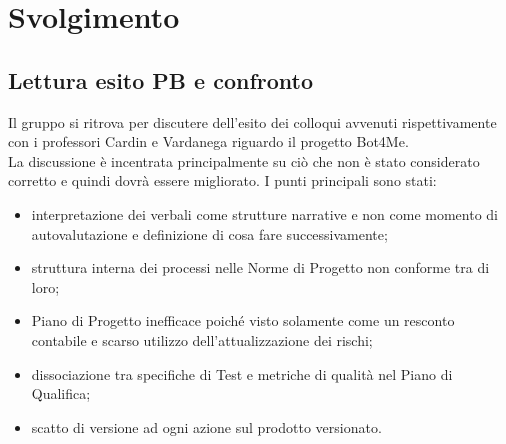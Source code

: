 \section{Svolgimento}

\subsection{Lettura esito PB e confronto }
Il gruppo si ritrova per discutere dell'esito dei colloqui avvenuti rispettivamente con i professori Cardin e Vardanega riguardo il progetto Bot4Me. \\
La discussione è incentrata principalmente su ciò che non è stato considerato corretto e quindi dovrà essere migliorato. I punti principali sono stati: 
\begin{itemize}
  \item interpretazione dei verbali come strutture narrative e non come momento di autovalutazione e definizione di cosa fare successivamente;
  \item struttura interna dei processi nelle Norme di Progetto non conforme tra di loro;
  \item Piano di Progetto inefficace poiché visto solamente come un resconto contabile e scarso utilizzo dell'attualizzazione dei rischi;
  \item dissociazione tra specifiche di Test e metriche di qualità nel Piano di Qualifica; 
  \item scatto di versione ad ogni azione sul prodotto versionato.
\end{itemize}

